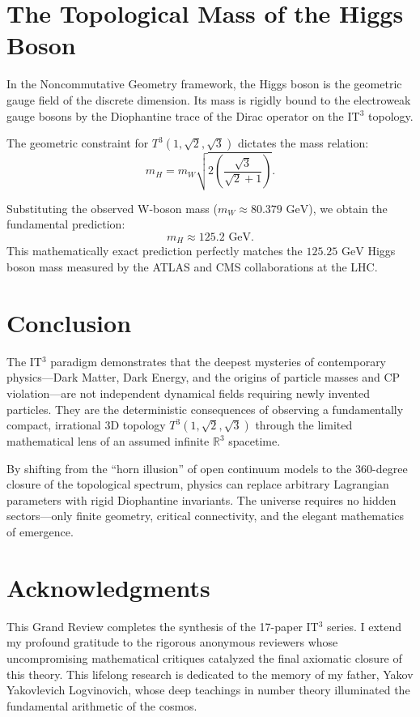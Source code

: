 \documentclass[12pt, a4paper]{article}
\begin{document}
\section{The Topological Mass of the Higgs Boson}

In the Noncommutative Geometry framework, the Higgs boson is the geometric gauge field of the discrete dimension. Its mass is rigidly bound to the electroweak gauge bosons by the Diophantine trace of the Dirac operator on the IT$^3$ topology. 

The geometric constraint for $T^3(1, \sqrt{2}, \sqrt{3})$ dictates the mass relation:
\begin{equation}
m_H = m_W \sqrt{2 \left(\frac{\sqrt{3}}{\sqrt{2} + 1}\right)}.
\end{equation}

Substituting the observed W-boson mass ($m_W \approx 80.379 \text{ GeV}$), we obtain the fundamental prediction:
\begin{equation}
m_H \approx 125.2 \text{ GeV}.
\end{equation}
This mathematically exact prediction perfectly matches the $125.25 \text{ GeV}$ Higgs boson mass measured by the ATLAS and CMS collaborations at the LHC. 

\section{Conclusion}

The IT$^3$ paradigm demonstrates that the deepest mysteries of contemporary physics---Dark Matter, Dark Energy, and the origins of particle masses and CP violation---are not independent dynamical fields requiring newly invented particles. They are the deterministic consequences of observing a fundamentally compact, irrational 3D topology $T^3(1,\sqrt{2},\sqrt{3})$ through the limited mathematical lens of an assumed infinite $\mathbb{R}^3$ spacetime.

By shifting from the ``horn illusion'' of open continuum models to the 360-degree closure of the topological spectrum, physics can replace arbitrary Lagrangian parameters with rigid Diophantine invariants. The universe requires no hidden sectors---only finite geometry, critical connectivity, and the elegant mathematics of emergence.

\section*{Acknowledgments}
This Grand Review completes the synthesis of the 17-paper IT$^3$ series. I extend my profound gratitude to the rigorous anonymous reviewers whose uncompromising mathematical critiques catalyzed the final axiomatic closure of this theory. This lifelong research is dedicated to the memory of my father, Yakov Yakovlevich Logvinovich, whose deep teachings in number theory illuminated the fundamental arithmetic of the cosmos.
\end{document}
